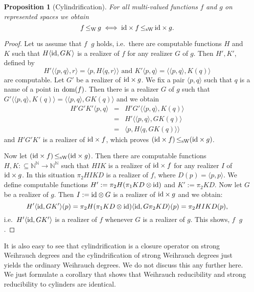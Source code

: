 \documentclass[jsl,10pt]{noasl}
\def\IN{{\mathbb{N}}}
\def\In{\subseteq}
\def\id{{\rm id}}
\def\dom{{\rm dom}}
\def\leqW{\mathop{\leq_{\mathrm{W}}}}
\def\leqSW{\mathop{\leq_{\mathrm{sW}}}}
\newtheorem{proposition}{Proposition}[section]
\begin{document}
\begin{proposition}[Cylindrification]
\label{prop:cylinder}
For all multi-valued functions $f$ and $g$ on represented spaces we obtain
\[f\leqW g\iff\id\times f\leqSW\id\times g.\]
\end{proposition}
\begin{proof}
Let us assume that $f\leqW g$ holds, i.e.\ there are computable functions
$H$ and $K$ such that $H\langle\id,GK\rangle$ is a realizer of $f$ for any realizer
$G$ of $g$. Then $H',K'$, defined by 
\[H'\langle\langle p,q\rangle,r\rangle=\langle p,H\langle q,r\rangle\rangle
 \mbox{ and }
 K'\langle p,q\rangle=\langle\langle p,q\rangle, K(q)\rangle\]
are computable.
Let $G'$ be a realizer of $\id\times g$. 
We fix a pair $\langle p,q\rangle$ such that $q$ is a name of a point in $\dom(f)$.
Then there is a realizer $G$ of $g$ such that 
$G'\langle\langle p,q\rangle,K(q)\rangle=\langle\langle p,q\rangle,GK(q)\rangle$
and we obtain
\begin{eqnarray*}
H'G'K'\langle p,q\rangle
&=& H'G'\langle\langle p,q\rangle,K(q)\rangle\\
&=& H'\langle\langle p,q\rangle,GK(q)\rangle\\
&=& \langle p,H\langle q,GK(q)\rangle\rangle
\end{eqnarray*}
and $H'G'K'$ is a realizer of $\id\times f$, 
which proves $(\id\times f)\leqSW(\id\times g)$.

Now let $(\id\times f)\leqSW(\id\times g)$. Then there are computable
functions $H,K:\In\IN^\IN\to\IN^\IN$ such that $HIK$ is a realizer of $\id\times f$
for any realizer $I$ of $\id\times g$. In this situation $\pi_2HIKD$ is a realizer of $f$,
where $D(p)=\langle p,p\rangle$.
We define computable functions $H':=\pi_2H(\pi_1KD\otimes\id)$ and $K':=\pi_2KD$.
Now let $G$ be a realizer of $g$.
Then $I:=\id\otimes G$ is a realizer of $\id\times g$ and we obtain:
\[
H'\langle\id,GK'\rangle(p)
= \pi_2H(\pi_1KD\otimes\id)\langle\id,G\pi_2KD\rangle(p)
= \pi_2HIKD(p),
\]
i.e.\ $H'\langle\id,GK'\rangle$ is a realizer of $f$ whenever $G$ is a realizer of $g$.
This shows, $f\leqW g$. 
\end{proof}

It is also easy to see that cylindrification is a closure operator
on strong Weihrauch degrees and the cylindrification of strong 
Weihrauch degrees just yields the ordinary Weihrauch degrees.
We do not discuss this any further here. We just formulate
a corollary that shows that Weihrauch reducibility and strong
reducibility to cylinders are identical.
\end{document}
